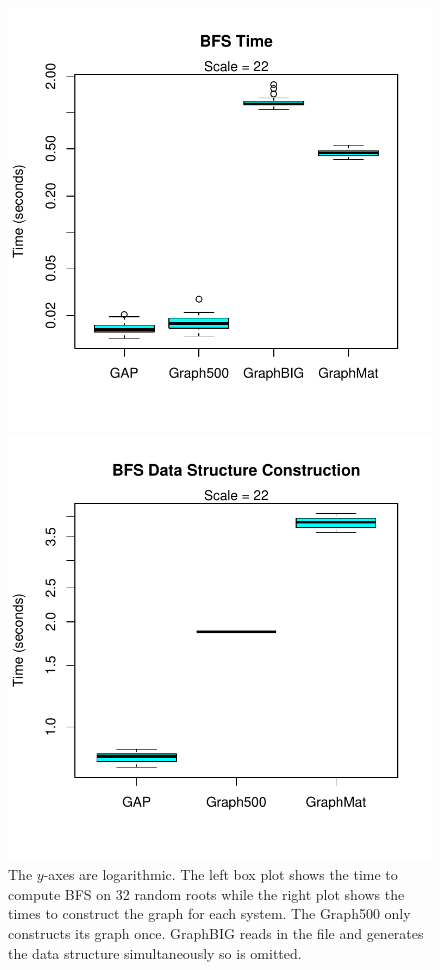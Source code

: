 \documentclass{llncs}
\begin{document}
\begin{figure}
	\centering
	\begin{minipage}{0.48\linewidth}
		\includegraphics[width=\linewidth, trim=0 36pt 18pt 0, clip]{graphics/bfs_time.pdf}
	\end{minipage}
	\begin{minipage}{0.48\linewidth}
		\includegraphics[width=\linewidth, trim=0 36pt 18pt 0, clip]{graphics/bfs_dsc.pdf}
	\end{minipage}
	\caption{The $y$-axes are logarithmic. The left box plot shows the time to compute BFS on 32 random roots while the right plot shows the times to construct the graph for each system. The Graph500 only constructs its graph once. GraphBIG reads in the file and generates the data structure simultaneously so is omitted.}
	\label{fig:bfs-time}
\end{figure}
\end{document}
